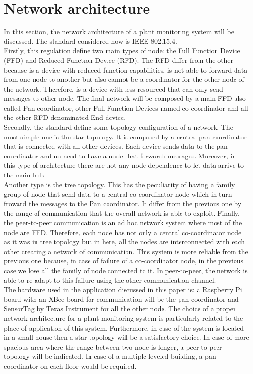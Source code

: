 \section{Network architecture}
In this section, the network architecture of a plant monitoring system will be discussed. The standard considered now is IEEE 802.15.4.\\
 Firstly, this regulation define two main types of node: the Full Function Device (FFD) and Reduced Function Device (RFD). The RFD differ from the other because is a device with reduced function capabilities, is not able to forward data from one node to another but also cannot be a coordinator for the other node of the network. Therefore, is a device with less resourced that can only send messages to other node. The final network will be composed by a main FFD also called Pan coordinator, other Full Function Devices named co-coordinator and all the other RFD denominated End device. \cite{802-15-4} \\
 Secondly, the standard define some topology configuration of a network. The most simple one is the star topology. It is composed by a central pan coordinator that is connected with all other devices. Each device sends data to the pan coordinator and no need to have a node that forwards messages. Moreover, in this type of architecture there are not any node dependence to let data arrive to the main hub.\\
 Another type is the tree topology. This has the peculiarity of having a family group of node that send data to a central co-coordinator node which in turn froward the messages to the Pan coordinator. It differ from the previous one by the range of communication that the overall network is able to exploit.
 Finally, the peer-to-peer communication is an ad hoc network system where most of the node are FFD. Therefore, each node has not only a central co-coordinator node as it was in tree topology but in here, all the nodes are interconnected with each other creating a network of communication. This system is more reliable from the previous one because, in case of failure of a co-coordinator node, in the previous case we lose all the family of node connected to it. In peer-to-peer, the network is able to re-adapt to this failure using the other communication channel. \cite{slide}\\
 The hardware used in the application discussed in this paper is: a Raspberry Pi board with an XBee board for communication will be the pan coordinator and SensorTag by Texas Instrument for all the other node. The choice of a proper network architecture for a plant monitoring system is particularly related to the place of application of this system. Furthermore, in case of the system is located in a small house then a star topology will be a satisfactory choice. In case of more spacious area where the range between two node is longer, a peer-to-peer topology will be indicated. In case of a multiple leveled building, a pan coordinator on each floor would be required.\\
